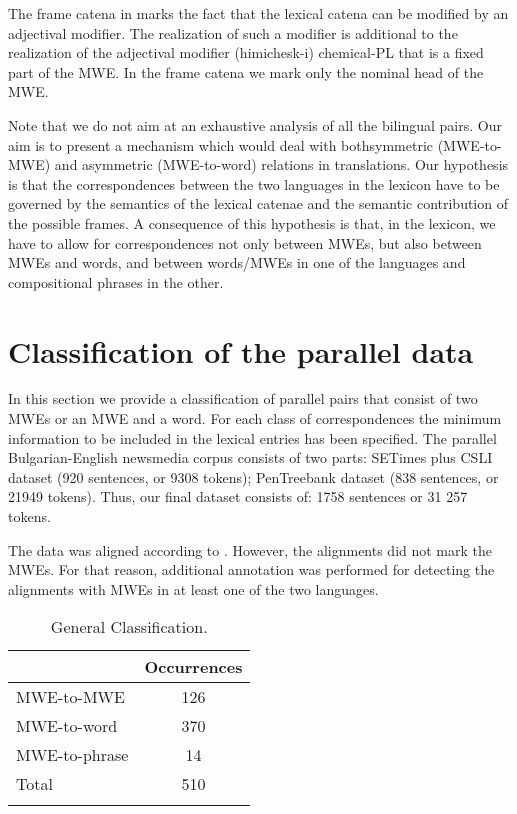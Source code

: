 \documentclass[output=paper]{langsci/langscibook}
\begin{document}
The frame catena in  marks the fact that the lexical catena
can be modified by an adjectival modifier. The realization of such a modifier is additional to the realization of the adjectival modifier \textit{} (himichesk-i) chemical-\textsc{PL} that is a fixed part of the MWE. In the frame catena we mark only the nominal head of the MWE.

Note that we do not aim at an exhaustive analysis of all the bilingual
pairs. Our aim is to present a mechanism which would deal with both\textemdash symmetric (MWE-to-MWE) and asymmetric (MWE-to-word) relations in
translations. Our hypothesis is that the correspondences between the two
languages in the lexicon have to be governed by the semantics of the lexical
catenae and the semantic contribution of the possible frames. A consequence
of this hypothesis is that, in the lexicon, we have to allow for correspondences
not only between MWEs, but also between MWEs and words, and between
words/MWEs in one of the languages and compositional phrases in the other.
 
\section{Classification of the parallel data}
\label{TheData}


In this section we provide a classification of parallel pairs that consist
of two MWEs or an MWE and a word. For each class of correspondences the
minimum information to be included in the lexical entries has been
specified.
The parallel Bulgarian-English newsmedia corpus consists of two parts: SETimes plus CSLI
dataset (920 sentences, or 9308 tokens); PenTreebank dataset (838 sentences,
or 21949 tokens). Thus, our final dataset consists of: 1758 sentences or 31
257 tokens.

The data was aligned according to \cite{Simov2011}. However, the
alignments did not mark the MWEs. For that reason, additional annotation was
performed for detecting the alignments with MWEs in at least one of the two
languages.

\begin{table} 
\begin{tabularx}{\textwidth}{QS}
\lsptoprule
& \textbf{Occurrences}\\
\midrule
MWE-to-MWE & 126 \\%
MWE-to-word & 370 \\%
MWE-to-phrase & 14 \\\hline
Total & 510 \\%
\lspbottomrule
\end{tabularx}
 \caption{General Classification.}
 \label{tab:GenClass}
\end{table}
\end{document}
